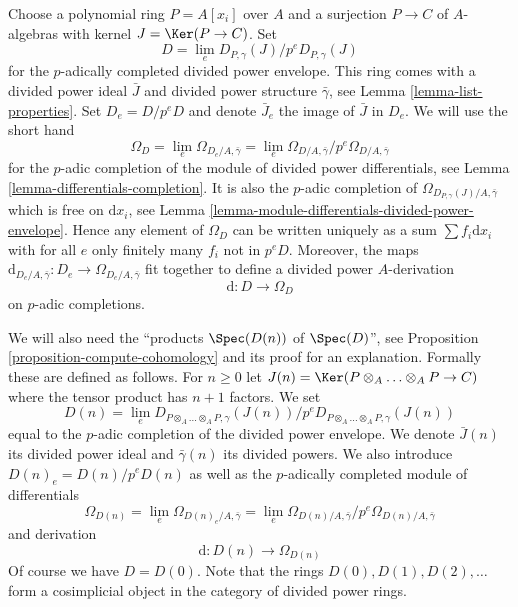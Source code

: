 \medskip\noindent
Choose a polynomial ring $P = A[x_i]$ over $A$ and a surjection $P \to C$
of $A$-algebras with kernel $J = \Ker(P \to C)$. Set
\begin{equation}
\label{equation-D}
D = \lim_e D_{P, \gamma}(J) / p^eD_{P, \gamma}(J)
\end{equation}
for the $p$-adically completed divided power envelope.
This ring comes with a divided power ideal $\bar J$ and divided power
structure $\bar \gamma$, see Lemma \ref{lemma-list-properties}.
Set $D_e = D/p^eD$ and denote $\bar J_e$ the image of $\bar J$ in $D_e$.
We will use the short hand
\begin{equation}
\label{equation-omega-D}
\Omega_D = \lim_e \Omega_{D_e/A, \bar\gamma} =
\lim_e \Omega_{D/A, \bar\gamma}/p^e\Omega_{D/A, \bar\gamma}
\end{equation}
for the $p$-adic completion of the module of divided power differentials,
see Lemma \ref{lemma-differentials-completion}.
It is also the $p$-adic completion of
$\Omega_{D_{P, \gamma}(J)/A, \bar\gamma}$
which is free on $\text{d}x_i$, see
Lemma \ref{lemma-module-differentials-divided-power-envelope}.
Hence any element of $\Omega_D$ can be written uniquely as a sum
$\sum f_i\text{d}x_i$ with for all $e$ only finitely many $f_i$
not in $p^eD$. Moreover, the maps
$\text{d}_{D_e/A, \bar\gamma} : D_e \to \Omega_{D_e/A, \bar\gamma}$
fit together to define a divided power $A$-derivation
\begin{equation}
\label{equation-derivation-D}
\text{d} : D \longrightarrow \Omega_D
\end{equation}
on $p$-adic completions.

\medskip\noindent
We will also need the ``products $\Spec(D(n))$ of $\Spec(D)$'', see
Proposition \ref{proposition-compute-cohomology} and its proof for an
explanation. Formally these are defined as follows. For $n \geq 0$ let
$J(n) = \Ker(P \otimes_A \ldots \otimes_A P \to C)$ where
the tensor product has $n + 1$ factors. We set
\begin{equation}
\label{equation-Dn}
D(n) = \lim_e
D_{P \otimes_A \ldots \otimes_A P, \gamma}(J(n))/
p^eD_{P \otimes_A \ldots \otimes_A P, \gamma}(J(n))
\end{equation}
equal to the $p$-adic completion of the divided power envelope.
We denote $\bar J(n)$ its divided power ideal and $\bar \gamma(n)$
its divided powers. We also introduce $D(n)_e = D(n)/p^eD(n)$ as well
as the $p$-adically completed module of differentials
\begin{equation}
\label{equation-omega-Dn}
\Omega_{D(n)} = \lim_e \Omega_{D(n)_e/A, \bar\gamma} =
\lim_e \Omega_{D(n)/A, \bar\gamma}/p^e\Omega_{D(n)/A, \bar\gamma}
\end{equation}
and derivation
\begin{equation}
\label{equation-derivation-Dn}
\text{d} : D(n) \longrightarrow \Omega_{D(n)}
\end{equation}
Of course we have $D = D(0)$. Note that the rings $D(0), D(1), D(2), \ldots$
form a cosimplicial object in the category of divided power rings.

